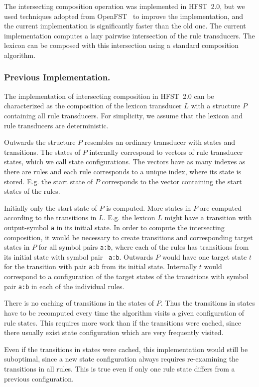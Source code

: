\documentclass{llncs}
\begin{document}
The intersecting composition operation was implemented in HFST~2.0, but
we used techniques adopted from OpenFST~\cite{openfst/2007} to improve
the implementation, and the current implementation is significantly
faster than the old one. The current implementation computes a lazy
pairwise intersection of the rule transducers. The lexicon can be
composed with this intersection using a standard composition
algorithm.

\subsubsection{Previous Implementation.}
The implementation of intersecting composition in HFST~2.0 can be
characterized as the composition of the lexicon transducer $L$ with a
structure $P$ containing all rule transducers. For simplicity,
we assume that the lexicon and rule transducers are deterministic.

Outwards the structure $P$ resembles an ordinary transducer with
states and transitions. The states of $P$ internally correspond to
vectors of rule transducer states, which we call state
configurations. The vectors have as many indexes as there are rules
and each rule corresponds to a unique index, where its state is
stored. E.g. the start state of $P$ corresponds to the vector
containing the start states of the rules.

Initially only the start state of $P$ is computed. More states in $P$
are computed according to the transitions in $L$. E.g. the lexicon $L$
might have a transition with output-symbol {\tt a} in its initial
state. In order to compute the intersecting composition, it would be
necessary to create transitions and corresponding target states in $P$
for all symbol pairs {\tt a:b}, where each of the rules has
transitions from its initial state with symbol pair {\tt
  a:b}. Outwards $P$ would have one target state $t$ for the
transition with pair {\tt a:b} from its initial state. Internally $t$
would correspond to a configuration of the target states of the
transitions with symbol pair {\tt a:b} in each of the individual rules.

There is no caching of transitions in the states of $P$. Thus the
transitions in states have to be recomputed every time the algorithm
visits a given configuration of rule states. This requires more work
than if the transitions were cached, since there usually exist state
configuration which are very frequently visited.

Even if the transitions in states were cached, this implementation
would still be suboptimal, since a new state configuration always
requires re-examining the transitions in all rules. This is true even
if only one rule state differs from a previous configuration.
\end{document}
